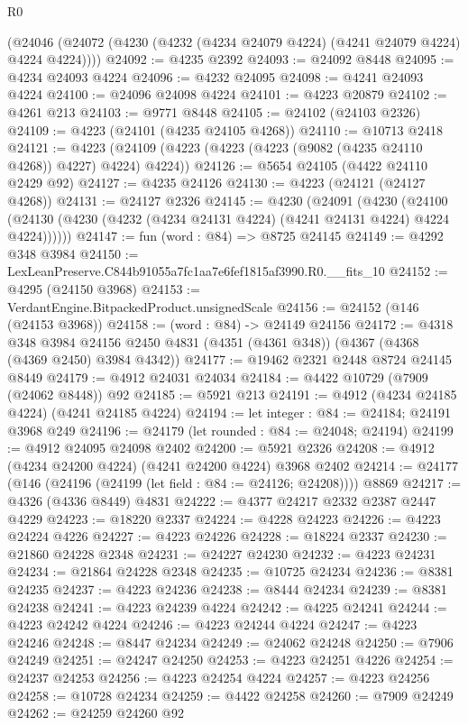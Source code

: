 \begin{lexlean}{R0}
\begin{coremodule}
    (@24046 (@24072 (@4230 (@4232 (@4234 @24079 @4224) (@4241 @24079 @4224) @4224 @4224))))
@24092 := @4235 @2392
@24093 := @24092 @8448
@24095 := @4234 @24093 @4224
@24096 := @4232 @24095
@24098 := @4241 @24093 @4224
@24100 := @24096 @24098 @4224
@24101 := @4223 @20879
@24102 := @4261 @213
@24103 := @9771 @8448
@24105 := @24102 (@24103 @2326)
@24109 := @4223 (@24101 (@4235 @24105 @4268))
@24110 := @10713 @2418
@24121 := @4223 (@24109 (@4223 (@4223 (@4223 (@9082 (@4235 @24110 @4268)) @4227) @4224) @4224))
@24126 := @5654 @24105 (@4422 @24110 @2429 @92)
@24127 := @4235 @24126
@24130 := @4223 (@24121 (@24127 @4268))
@24131 := @24127 @2326
@24145 := @4230
    (@24091
      (@4230
        (@24100 (@24130 (@4230 (@4232 (@4234 @24131 @4224) (@4241 @24131 @4224) @4224 @4224))))))
@24147 := fun (word : @84) => @8725 @24145
@24149 := @4292 @348 @3984
@24150 := LexLeanPreserve.C844b91055a7fc1aa7e6fef1815af3990.R0.__fits_10
@24152 := @4295 (@24150 @3968)
@24153 := VerdantEngine.BitpackedProduct.unsignedScale
@24156 := @24152 (@146 (@24153 @3968))
@24158 := (word : @84) -> @24149 @24156
@24172 := @4318
    @348
    @3984
    @24156
    @2450
    @4831
    (@4351 (@4361 @348))
    (@4367 (@4368 (@4369 @2450) @3984 @4342))
@24177 := @19462 @2321 @2448 @8724 @24145 @8449
@24179 := @4912 @24031 @24034
@24184 := @4422 @10729 (@7909 (@24062 @8448)) @92
@24185 := @5921 @213
@24191 := @4912 (@4234 @24185 @4224) (@4241 @24185 @4224)
@24194 := let integer : @84 := @24184; @24191 @3968 @249
@24196 := @24179 (let rounded : @84 := @24048; @24194)
@24199 := @4912 @24095 @24098 @2402
@24200 := @5921 @2326
@24208 := @4912 (@4234 @24200 @4224) (@4241 @24200 @4224) @3968 @2402
@24214 := @24177 (@146 (@24196 (@24199 (let field : @84 := @24126; @24208)))) @8869
@24217 := @4326 (@4336 @8449) @4831
@24222 := @4377 @24217 @2332 @2387 @2447 @4229
@24223 := @18220 @2337
@24224 := @4228 @24223
@24226 := @4223 @24224 @4226
@24227 := @4223 @24226
@24228 := @18224 @2337
@24230 := @21860 @24228 @2348
@24231 := @24227 @24230
@24232 := @4223 @24231
@24234 := @21864 @24228 @2348
@24235 := @10725 @24234
@24236 := @8381 @24235
@24237 := @4223 @24236
@24238 := @8444 @24234
@24239 := @8381 @24238
@24241 := @4223 @24239 @4224
@24242 := @4225 @24241
@24244 := @4223 @24242 @4224
@24246 := @4223 @24244 @4224
@24247 := @4223 @24246
@24248 := @8447 @24234
@24249 := @24062 @24248
@24250 := @7906 @24249
@24251 := @24247 @24250
@24253 := @4223 @24251 @4226
@24254 := @24237 @24253
@24256 := @4223 @24254 @4224
@24257 := @4223 @24256
@24258 := @10728 @24234
@24259 := @4422 @24258
@24260 := @7909 @24249
@24262 := @24259 @24260 @92

\end{coremodule}
\end{lexlean}
